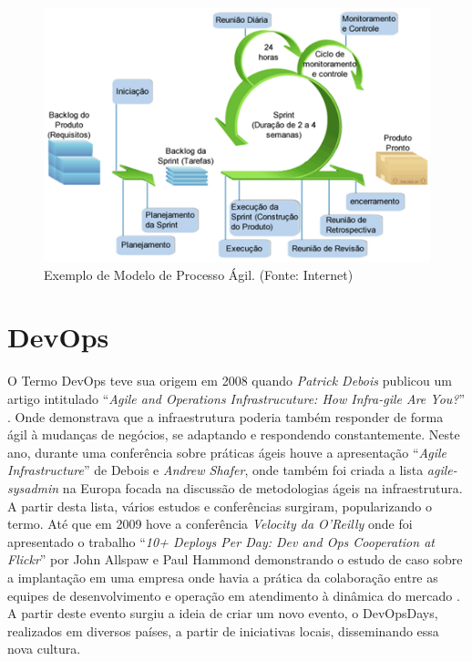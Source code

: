 \begin{figure}[H]
\centering
\includegraphics[width=.75\textwidth]{fig/figura23.png}
\caption{Exemplo de Modelo de Processo Ágil. (Fonte: Internet)}
\label{fig:figure23}
\end{figure}

\section{DevOps}
\label{sec:devops}

O Termo DevOps teve sua origem em 2008 quando \textit{Patrick Debois} publicou um artigo intitulado “\textit{Agile and Operations Infrastrucuture: How Infra-gile Are You?}” \cite{Debois2008}. Onde demonstrava que a infraestrutura poderia também responder de forma ágil à mudanças de negócios, se adaptando e respondendo constantemente. Neste ano, durante uma conferência sobre práticas ágeis houve a apresentação “\textit{Agile Infrastructure}” de Debois e \textit{Andrew Shafer}, onde também foi criada a lista \textit{agile-sysadmin} na Europa focada na discussão de metodologias ágeis na infraestrutura. A partir desta lista, vários estudos e conferências surgiram, popularizando o termo. Até que em 2009 hove a conferência \textit{Velocity da O’Reilly} onde foi apresentado o trabalho “\textit{10+ Deploys Per Day: Dev and Ops Cooperation at Flickr}” por  John Allspaw e Paul Hammond demonstrando o estudo de caso sobre a implantação em uma empresa onde havia a prática da colaboração entre as equipes de desenvolvimento e operação em atendimento à dinâmica do mercado \cite{ALLSPAW2009}. A partir deste evento surgiu a ideia de criar um novo evento, o DevOpsDays, realizados em diversos países, a partir de iniciativas locais, disseminando essa nova cultura.

